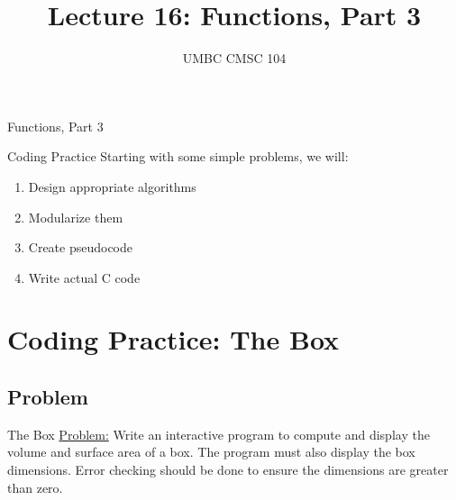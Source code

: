 \documentclass[graphics]{beamer}
\title{Lecture 16: Functions, Part 3}
\author{UMBC CMSC 104}
\date{}
\begin{document}
\begin{frame}{}
\centering
    Functions, Part 3
\end{frame}

\frame{\tableofcontents}

\begin{frame}{Coding Practice}
    Starting with some simple problems, we will:
    \begin{enumerate}
        \item Design appropriate algorithms
        \item Modularize them
        \item Create pseudocode
        \item Write actual C code
    \end{enumerate}
\end{frame}

\section{Coding Practice: The Box}
\subsection{Problem}
\begin{frame}{The Box}
    \underline{Problem:} Write an interactive program to compute and display the volume and surface area of a box. The program must also display the box dimensions. Error checking should be done to ensure the dimensions are greater than zero.
\end{frame}
\end{document}
